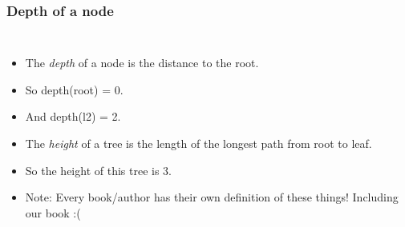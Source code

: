 \begin{frame}
	\frametitle{Depth of a node}

	\begin{columns}[T]
		\begin{itemize}
			\item The \textit{depth} of a \alert<5->{node} is the distance to the root.
				
			\item So depth(root) = 0.
			\item And depth(l2) = 2.
				
			\item The \textit{height} of a \alert<5->{tree} is the length of the longest path from root to leaf.
				
			\item So the height of this tree is 3.
				
			\item Note: Every book/author has their own definition of these things! Including our book :(
		\end{itemize}
	\end{columns}
	
\end{frame}


